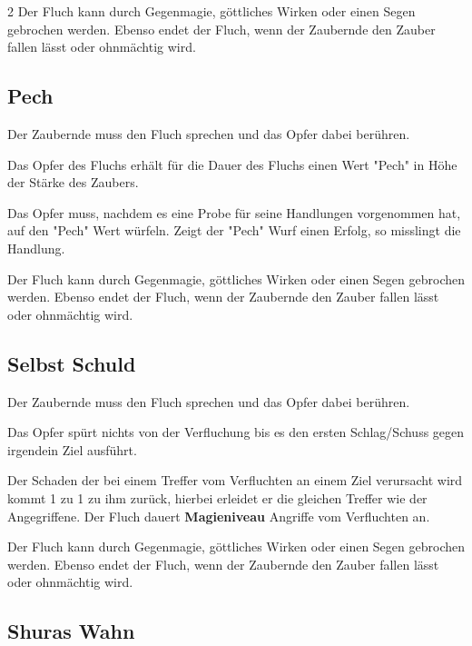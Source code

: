 \begin{multicols*}{2}
Der Fluch kann durch Gegenmagie, göttliches Wirken oder einen Segen gebrochen werden. Ebenso endet der Fluch, wenn der Zaubernde den Zauber fallen lässt oder ohnmächtig wird.



\subsection{Pech}

Der Zaubernde muss den Fluch sprechen und das Opfer dabei berühren.

Das Opfer des Fluchs erhält für die Dauer des Fluchs einen Wert "Pech" in Höhe der Stärke des Zaubers.

Das Opfer muss, nachdem es eine Probe für seine Handlungen vorgenommen hat, auf den "Pech" Wert würfeln. Zeigt der "Pech" Wurf einen Erfolg, so misslingt die Handlung.

Der Fluch kann durch Gegenmagie, göttliches Wirken oder einen Segen gebrochen werden. Ebenso endet der Fluch, wenn der Zaubernde den Zauber fallen lässt oder ohnmächtig wird.



\subsection{Selbst Schuld}

Der Zaubernde muss den Fluch sprechen und das Opfer dabei berühren.

Das Opfer spürt nichts von der Verfluchung bis es den ersten Schlag/Schuss gegen irgendein Ziel ausführt.

Der Schaden der bei einem Treffer vom Verfluchten an einem Ziel verursacht wird kommt 1 zu 1 zu ihm zurück, hierbei erleidet er die gleichen Treffer wie der Angegriffene. Der Fluch dauert \textbf{Magieniveau} Angriffe vom Verfluchten an.

Der Fluch kann durch Gegenmagie, göttliches Wirken oder einen Segen gebrochen werden. Ebenso endet der Fluch, wenn der Zaubernde den Zauber fallen lässt oder ohnmächtig wird.



\subsection{Shuras Wahn}


\end{multicols*}
